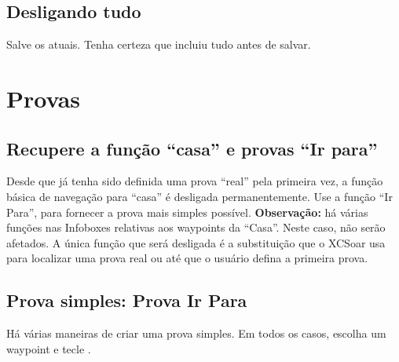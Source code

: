 \documentclass[a4paper,12pt,utf8]{scrreprt}
\begin{document}
\subsection*{\textcolor{flashblue}{Desligando tudo}}
Salve os atuais.  Tenha certeza que incluiu tudo antes de salvar.

\section{Provas}

\subsection{\textcolor{flashblue}{Recupere a função “casa” e provas “Ir para”}}
Desde que já tenha sido definida uma prova “real” pela primeira vez, a função básica de navegação para “casa” é desligada permanentemente.  Use a função “Ir Para”, para fornecer a prova mais simples possível. \textbf{Observação:} há várias funções nas Infoboxes relativas aos waypoints da “Casa”.  Neste caso, não serão afetados.  A única função que será desligada é a substituição que o XCSoar usa para localizar uma prova real ou até que o usuário defina a primeira prova.

\subsection{\textcolor{flashblue}{Prova simples: Prova Ir Para}}
Há várias maneiras de criar uma prova simples.  Em todos os casos, escolha um waypoint e tecle .
\end{document}
